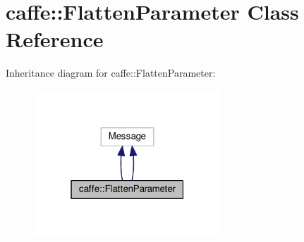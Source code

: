 \hypertarget{classcaffe_1_1_flatten_parameter}{}\section{caffe\+:\+:Flatten\+Parameter Class Reference}
\label{classcaffe_1_1_flatten_parameter}


Inheritance diagram for caffe\+:\+:Flatten\+Parameter\+:
\nopagebreak
\begin{figure}[H]
\begin{center}
\leavevmode
\includegraphics[width=199pt]{classcaffe_1_1_flatten_parameter__inherit__graph}
\end{center}
\end{figure}
